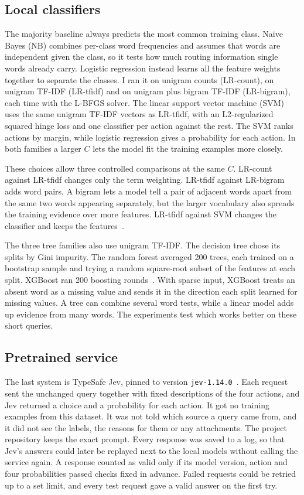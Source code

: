\documentclass[conference]{IEEEtran}
\begin{document}
\subsection{Local classifiers}
The majority baseline always predicts the most common training class. Naive Bayes (NB) combines per-class word frequencies and assumes that words are independent given the class, so it tests how much routing information single words already carry. Logistic regression instead learns all the feature weights together to separate the classes. I ran it on unigram counts (LR-count), on unigram TF-IDF (LR-tfidf) and on unigram plus bigram TF-IDF (LR-bigram), each time with the L-BFGS solver. The linear support vector machine (SVM) uses the same unigram TF-IDF vectors as LR-tfidf, with an L2-regularized squared hinge loss and one classifier per action against the rest. The SVM ranks actions by margin, while logistic regression gives a probability for each action. In both families a larger \(C\) lets the model fit the training examples more closely.

These choices allow three controlled comparisons at the same \(C\). LR-count against LR-tfidf changes only the term weighting. LR-tfidf against LR-bigram adds word pairs. A bigram lets a model tell a pair of adjacent words apart from the same two words appearing separately, but the larger vocabulary also spreads the training evidence over more features. LR-tfidf against SVM changes the classifier and keeps the features~\cite{sklearn}.

The three tree families also use unigram TF-IDF. The decision tree chose its splits by Gini impurity. The random forest averaged 200 trees, each trained on a bootstrap sample and trying a random square-root subset of the features at each split. XGBoost ran 200 boosting rounds~\cite{xgboost}. With sparse input, XGBoost treats an absent word as a missing value and sends it in the direction each split learned for missing values. A tree can combine several word tests, while a linear model adds up evidence from many words. The experiments test which works better on these short queries.

\subsection{Pretrained service}
The last system is TypeSafe Jev, pinned to version \texttt{jev-1.14.0}~\cite{jev}. Each request sent the unchanged query together with fixed descriptions of the four actions, and Jev returned a choice and a probability for each action. It got no training examples from this dataset. It was not told which source a query came from, and it did not see the labels, the reasons for them or any attachments. The project repository keeps the exact prompt. Every response was saved to a log, so that Jev's answers could later be replayed next to the local models without calling the service again. A response counted as valid only if its model version, action and four probabilities passed checks fixed in advance. Failed requests could be retried up to a set limit, and every test request gave a valid answer on the first try.
\end{document}
